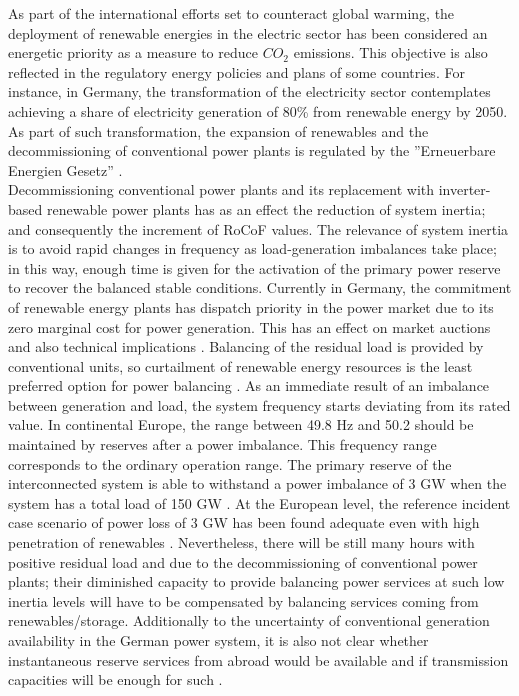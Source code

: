 As part of the international efforts set to counteract global warming, the deployment of renewable energies in the electric sector has been considered an energetic priority as a measure to reduce $CO_{2}$ emissions. This objective is also reflected in the regulatory energy policies and plans of some countries. For instance, in Germany, the transformation of the electricity sector contemplates achieving a share of electricity generation of 80\% from renewable energy by 2050. As part of such transformation, the expansion of renewables and the decommissioning of conventional power plants is regulated by the ''Erneuerbare Energien Gesetz” \cite{AgoraEnergiewende.}.\\

Decommissioning conventional power plants and its replacement with inverter-based renewable power plants has as an effect the reduction of system inertia; and consequently the increment of RoCoF values. The relevance of system inertia is to avoid rapid changes in frequency as load-generation imbalances take place; in this way, enough time is given for the activation of the primary power reserve to recover the balanced stable conditions. Currently in Germany, the commitment of renewable energy plants has dispatch priority in the power market due to its zero marginal cost for power generation. This has an effect on market auctions and also technical implications \cite{energiewende2017flexibility}. Balancing of the residual load is provided by conventional units, so curtailment of renewable energy resources is the least preferred option for power balancing \cite{dena2014}. As an immediate result of an imbalance between generation and load, the system frequency starts deviating from its rated value. In continental Europe, the range between 49.8 Hz and 50.2 should be maintained by reserves after a power imbalance. This frequency range corresponds to the ordinary operation range. The primary reserve of the interconnected system is able to withstand a power imbalance of 3 GW when the system has a total load of 150 GW \cite{ENTSOE.2016}. At the European level, the reference incident case scenario of power loss of 3 GW has been found adequate even with high penetration of renewables \cite{ENTSOE.2016, dena2014}. Nevertheless, there will be still many hours with positive residual load and due to the decommissioning of conventional power plants; their diminished capacity to provide balancing power services at such low inertia levels will have to be compensated by balancing services coming from renewables/storage. Additionally to the uncertainty of conventional generation availability in the German power system, it is also not clear whether instantaneous reserve services from abroad would be available and if transmission capacities will be enough for such \cite{dena2014}.\\

